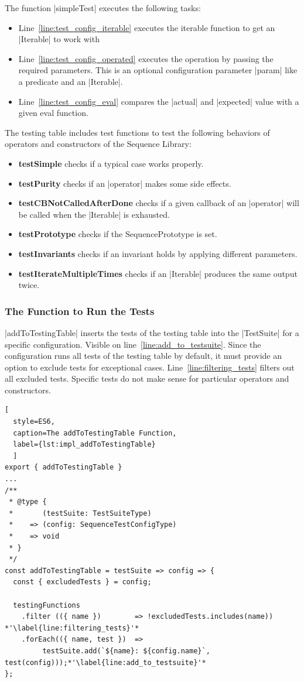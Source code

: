 The function |simpleTest| executes the following tasks:
\begin{itemize}
  \item{Line~\ref{line:test_config_iterable} executes the iterable function to
    get an |Iterable| to work with}
  \item{Line~\ref{line:test_config_operated} executes the operation by passing
    the required parameters. This is an optional configuration parameter |param| like a predicate and an |Iterable|.}
  \item{Line~\ref{line:test_config_eval} compares the |actual| and |expected| value with a given eval function. } 
\end{itemize}

The testing table includes test functions to test the following behaviors of
operators and constructors of the Sequence Library:

\begin{itemize}
  \item{\textbf{testSimple} checks if a typical case works properly.}
  \item{\textbf{testPurity} checks if an |operator| makes some side effects.}
  \item{\textbf{testCBNotCalledAfterDone} checks if a given callback of an
    |operator| will be called when the |Iterable| is exhausted.}
  \item{\textbf{testPrototype} checks if the SequencePrototype is set.}
  \item{\textbf{testInvariants} checks if an invariant holds by applying different parameters.}
  \item{\textbf{testIterateMultipleTimes} checks if an |Iterable| produces the same output twice.}
\end{itemize}


\subsubsection{The Function to Run the Tests}
\label{subsub:The Function to Run the Tests}
|addToTestingTable| inserts the tests of the testing table into the |TestSuite| for a
specific configuration. Visible on line~\ref{line:add_to_testsuite}. 
Since the configuration runs all tests of the testing table by default, it
must provide an option to exclude tests for exceptional cases. 
Line~\ref{line:filtering_tests} filters out all excluded tests.
Specific tests do not make sense for particular operators and constructors.

\begin{lstlisting}[
  style=ES6, 
  caption=The addToTestingTable Function,
  label={lst:impl_addToTestingTable}
  ]
export { addToTestingTable }
...
/**
 * @type {
 *       (testSuite: TestSuiteType)
 *    => (config: SequenceTestConfigType)
 *    => void
 * }
 */
const addToTestingTable = testSuite => config => {
  const { excludedTests } = config;

  testingFunctions
    .filter (({ name })        => !excludedTests.includes(name)) *'\label{line:filtering_tests}'*
    .forEach(({ name, test })  => 
         testSuite.add(`${name}: ${config.name}`, test(config)));*'\label{line:add_to_testsuite}'*
};
\end{lstlisting}

